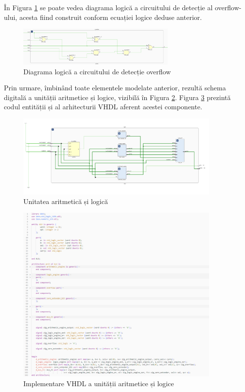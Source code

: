 \documentclass[12pt]{article}
\begin{document}
În Figura \ref{Figura:28} se poate vedea diagrama logică a circuitului de detecție al overflow-ului, acesta fiind construit conform ecuației logice deduse anterior.

 \begin{figure}[h!]
 \includegraphics[width=0.7\textwidth]{overflow.png}
 \centering
 \caption{Diagrama logică a circuitului de detecție overflow}
 \label{Figura:28}
 \end{figure}
 
\newpage

Prin urmare, îmbinând toate elementele modelate anterior, rezultă schema digitală a unității aritmetice și logice, vizibilă în Figura \ref{Figura:21}. Figura \ref{Figura:29} prezintă codul entității și al arhitecturii VHDL aferent acestei componente.
\begin{figure}[h!]
 \includegraphics[width=0.9\textwidth]{ALU.png}
 \centering
 \caption{Unitatea aritmetică și logică}
 \label{Figura:21}
 \end{figure}


\begin{figure}[h!]
 \includegraphics[width=0.9\textwidth]{aluVHDL.png}
 \centering
 \caption{Implementare VHDL a unității aritmetice și logice}
 \label{Figura:29}
 \end{figure}
 
\end{document}
